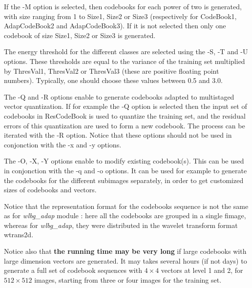 If the -M option is selected, then codebooks for each power of two is 
generated, with size ranging from 1 to Size1, Size2 or Size3 
(respectively for CodeBook1, AdapCodeBook2 and AdapCodeBook3). 
If it is not selected then only one codebook of size Size1, Size2 or Size3 
is generated. 

The energy threshold for the different classes are selected using 
the -S, -T and -U options. These thresholds are equal to the variance 
of the training set multiplied by ThresVal1, ThresVal2 or ThresVal3 
(these are positive floating point numbers). 
Typically, one should choose these values between 0.5 and 3.0. 

The -Q and -R options enable to generate codebooks adapted to 
multistaged vector quantization. If for example the -Q option 
is selected then the input set of codebooks in ResCodeBook is used 
to quantize the training set, and the residual errors of this quantization 
are used to form a new codebook. The process can be iterated with the 
-R option. Notice that these options should not be used in conjonction with 
the -x and -y options. 

The -O, -X, -Y options enable to modify existing codebook(s). This can be used 
in conjonction with the -q and -o options. It can be used for example 
to generate the codebooks for the different subimages separately, 
in order to get customized sizes of codebooks and vectors. 

Notice that the representation format for the codebooks sequence is not the 
same as for {\em wlbg\_adap} module : here all the codebooks are grouped in 
a single fimage, whereas for {\em wlbg\_adap}, they were distributed in 
the wavelet transform format wtrans2d. 

Notice also that {\bf the running time may be very long} if large codebooks 
with large dimension vectors are generated. It may takes several hours 
(if not days) to generate a full set of codebook sequences with $4\times 4$ 
vectors at level 1 and 2, for $512\times 512$ images, starting from three 
or four images for the training set. 

